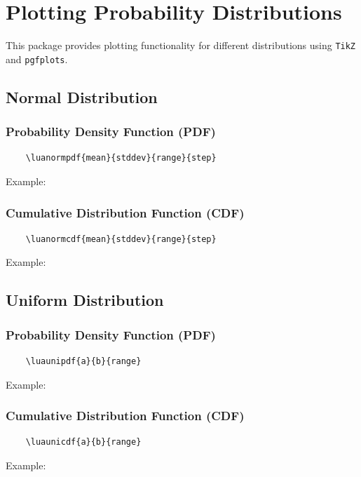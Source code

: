 \section{Plotting Probability Distributions}
This package provides plotting functionality for different distributions using \texttt{TikZ} and \texttt{pgfplots}.

\subsection{Normal Distribution}
\subsubsection{Probability Density Function (PDF)}
\begin{verbatim}
	\luanormpdf{mean}{stddev}{range}{step}
\end{verbatim}
Example:
\begin{center}
\end{center}

\subsubsection{Cumulative Distribution Function (CDF)}
\begin{verbatim}
	\luanormcdf{mean}{stddev}{range}{step}
\end{verbatim}
Example:
\begin{center}
\end{center}

\subsection{Uniform Distribution}
\subsubsection{Probability Density Function (PDF)}
\begin{verbatim}
	\luaunipdf{a}{b}{range}
\end{verbatim}
Example:
\begin{center}
\end{center}

\subsubsection{Cumulative Distribution Function (CDF)}
\begin{verbatim}
	\luaunicdf{a}{b}{range}
\end{verbatim}
Example:
\begin{center}
\end{center}

